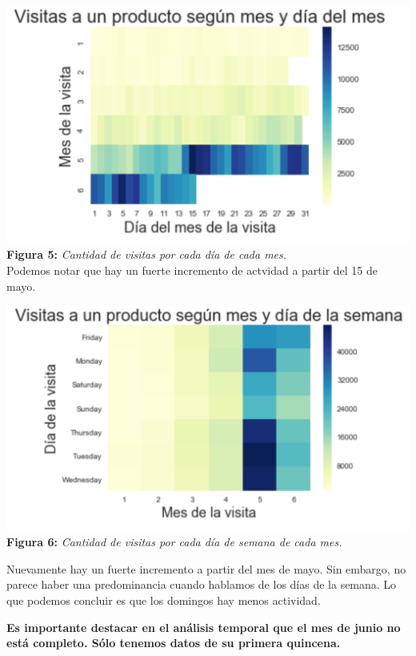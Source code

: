 \documentclass[titlepage,a4paper]{article}
\begin{document}
	\begin{center}
	\includegraphics[width=15cm]{visitasSegunmesDiaMes.jpg}\\
	\textbf{Figura 5:}  \textit{Cantidad de visitas por cada día de cada mes. }\\
	Podemos notar que hay un fuerte incremento de actvidad a partir del 15 de mayo. 
	
	\end{center}
	\begin{center}
	\includegraphics[width=15cm]{visitasSegunMesYDiaDeSemana.jpg}\\
	\textbf{Figura 6:}  \textit{Cantidad de visitas por cada día de semana de cada mes.   }
	\end{center}
	Nuevamente hay un fuerte incremento a partir del mes de mayo. Sin embargo, no parece haber una predominancia cuando hablamos de los días de la semana. Lo que podemos concluir es que los domingos hay menos actividad. 
	
	\textbf{Es importante destacar en el análisis temporal que el mes de  junio no está completo. Sólo tenemos datos de su primera quincena. }
	
\end{document}
